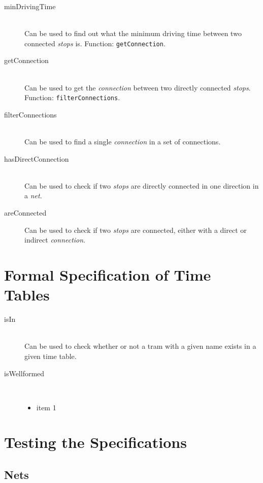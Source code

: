 \documentclass[a4]{article}
\begin{document}
\begin{description}
    \item[minDrivingTime] \hfill \\ Can be used to find out what the minimum driving time between two connected \emph{stops} is. Function: \verb=getConnection=.
    \item[getConnection] \hfill \\ Can be used to get the \emph{connection} between two directly connected \emph{stops}. Function: \verb=filterConnections=.
    \item[filterConnections] \hfill \\ Can be used to find a single \emph{connection} in a set of connections.
    \item[hasDirectConnection] \hfill \\ Can be used to check if two \emph{stops} are directly connected in one direction in a \emph{net}.
    \item[areConnected] Can be used to check if two \emph{stops} are connected, either with a direct or indirect \emph{connection}.
\end{description}  

\section{Formal Specification of Time Tables}



\begin{description}
    \item[isIn] \hfill \\ Can be used to check whether or not a tram with a given name exists in a given time table.
    \item[isWellformed] \hfill \\ 
        \begin{itemize}
            \item item 1
        \end{itemize}
\end{description}

\section{Testing the Specifications}

\subsection{Nets}
\end{document}
